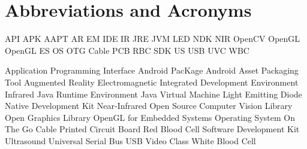 \chapter{Abbreviations and Acronyms}\label{chapter:abbreviations}

\begin{multicols}{2}
\setlength{\parindent}{0pt}

	API
	\hfill \break
	APK
	\hfill \break
	AAPT
	\hfill \break
	AR
	\hfill \break 
	EM
	\hfill \break 
	IDE
	\hfill \break 
	IR
	\hfill \break 
	JRE
	\hfill \break
	JVM
	\hfill \break
	LED
	\hfill \break 
	NDK
	\hfill \break
	NIR
	\hfill \break 
	OpenCV
	\hfill \break
	OpenGL
	\hfill \break
	OpenGL ES
	\hfill \break
	OS
	\hfill \break
	OTG Cable
	\hfill \break 
	PCB	
	\hfill \break
	RBC
	\hfill \break 
	SDK
	\hfill \break 
	US
	\hfill \break 
	USB
	\hfill \break
	UVC	
	\hfill \break 
	WBC



	
\columnbreak
 
	Application Programming Interface
	\hfill \break
	Android PacKage 
	\hfill \break
	Android Asset Packaging Tool
	\hfill \break
	Augmented Reality
	\hfill \break 
	Electromagnetic
	\hfill \break 
	Integrated Development Environment
	\hfill \break 
	Infrared
	\hfill \break
	Java Runtime Environment
	\hfill \break
	Java Virtual Machine
	\hfill \break 
	Light Emitting Diode
 	\hfill \break
	Native Development Kit 
	\hfill \break
	Near-Infrared
	\hfill \break
	Open Source Computer Vision Library
	\hfill \break
	Open Graphics Library
	\hfill \break
	OpenGL for Embedded Systems
	\hfill \break
	Operating System
 	\hfill \break
	On The Go Cable
	\hfill \break
	Printed Circuit Board
	\hfill \break
	Red Blood Cell 
	\hfill \break
	Software Development Kit
	\hfill \break
	Ultrasound
	\hfill \break 
	Universal Serial Bus
	\hfill \break 
	USB Video Class
	\hfill \break
	White Blood Cell 

\end{multicols}